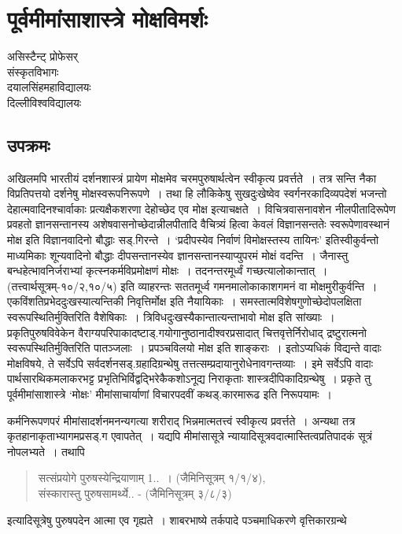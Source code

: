 {\fontsize{15}{17}\selectfont
\presetvalues
\chapter{पूर्वमीमांसाशास्त्रे मोक्षविमर्शः}

\begin{center}
\smallskip

असिस्टैन्ट् प्रोफेसर्\\
संस्कृतविभागः\\
दयालसिंहमहाविद्यालयः\\
दिल्लीविश्वविद्यालयः
\addrule
\end{center}
 
\section*{उपक्रमः}

अखिलमपि भारतीयं दर्शनशास्त्रं प्रायेण मोक्षमेव चरमपुरुषार्थत्वेन स्वीकृत्य प्रवर्त्तते~। तत्र सन्ति नैका विप्रतिपत्तयो दर्शनेषु मोक्षस्वरूपनिरूपणे~। तथा हि लौकिकेषु सुखदुःखेष्वेव स्वर्गनरकादिव्यपदेशं भजन्तो देहात्मवादिनश्चार्वाकाः प्रत्यक्षैकशरणा देहोच्छेद एव मोक्ष इत्याचक्षते~। विचित्रवासनावशेन नीलपीतादिरूपेण प्रवहतो ज्ञानसन्तानस्य अशेषवासनोच्छेदान्नीलपीतादि वैचित्र्यं हित्वा केवलं विज्ञानसन्ततेः स्वरूपेणावस्थानं मोक्ष इति विज्ञानवादिनो बौद्धाः सड्.गिरन्ते~। ‘प्रदीपस्येव निर्वाणं विमोक्षस्तस्य तायिनः’ इतिस्वीकुर्वन्तो माध्यमिकाः शून्यवादिनो बौद्धाः दीपसन्तानस्येव ज्ञानसन्तानस्याप्युपरमं मोक्षं वदन्ति~। जैनास्तु  बन्धहेत्भावनिर्जराभ्यां कृत्स्नकर्मविप्रमोक्षणं मोक्षः~। तदनन्तरमूर्ध्वं गच्छत्यालोकान्तात्~। (तत्त्वार्थसूत्रम्-१०/२,१०/५) इति व्याहरन्तः सततमूर्ध्व गमनमालोकाकाशगमनं वा मोक्षमुरीकुर्वन्ति~। एकविंशतिप्रभेददुःखस्यात्यन्तिकी निवृत्तिर्मोक्ष इति नैयायिकाः~। समस्तात्मविशेषगुणोच्छेदोपलक्षिता स्वरूपस्थितिर्मुक्तिरिति वैशेषिकाः~। त्रिविधदुःखस्यैकान्तात्यन्ताभावो मोक्ष इति सांख्याः~। प्रकृतिपुरुषविवेकेन वैराग्यपरिपाकादष्टाड्.गयोगानुष्ठानादीश्वरप्रसादात् चित्तवृत्तेर्निरोधाद् द्रष्टुरात्मनो स्वरूपस्थितिर्मुक्तिरिति पातञ्जलाः~। प्रपञ्चविलयो मोक्ष इति शाङ्कराः~। इतोऽप्यधिकं विद्यन्ते वादाः मोक्षविषये, ते सर्वेऽपि सर्वदर्शनसड्.ग्रहादिग्रन्थेषु तत्तत्सम्प्रदायानुरोधेनावगन्तव्याः~। इमे सर्वेऽपि वादाः पार्थसारथिकमलाकरभट्ट प्रभृतिभिर्विद्वद्भिरेकैकशोऽनूद्य निराकृताः शास्त्रदीपिकादिग्रन्थेषु~। प्रकृते तु पूर्वमीमांसाशास्त्रे ‘मोक्षः’ मीमांसाचार्याणां विचारपदवीं कथड्.कारमारूढ इति निरूपयामः~। 

कर्मनिरूपणपरं मीमांसादर्शनमनन्यगत्या शरीराद् भिन्नमात्मतत्त्वं स्वीकृत्य प्रवर्त्तते~। अन्यथा तत्र कृतहानाकृताभ्यागमप्रसड्.ग एवापतेत्~। यद्यपि मीमांसासूत्रे न्यायादिसूत्रवदात्मास्तित्वप्रतिपादकं सूत्रं नोपलभ्यते~। तथापि 
\begin{verse}
सत्संप्रयोगे पुरुषस्येन्द्रियाणाम् 1..~। (जैमिनिसूत्रम् १/­१/४), \\
संस्कारास्तु पुरुषसामर्थ्ये.. - (जैमिनिसूत्रम् ३/­८/३) 
\end{verse}
इत्यादिसूत्रेषु पुरुषपदेन आत्मा एव गृह्यते~। शाबरभाष्ये तर्कपादे पञ्चमाधिकरणे वृत्तिकारग्रन्थे 

}
